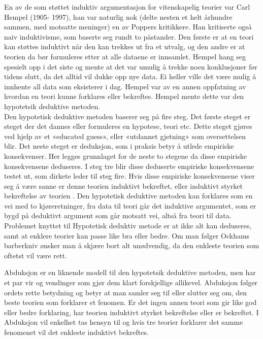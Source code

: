 \documentclass[
]{book}
\begin{document}
En av de som støttet induktiv argumentasjon for vitenskapelig teorier var Carl Hempel (1905- 1997), han var naturlig nok (delte nesten et helt århundre sammen, med motsatte meninger) en av Poppers kritikkere. Han kritiserte også naiv induktivisme, som baserte seg rundt to påstander. Den første er at en teori kan støttes induktivt når den kan trekkes ut fra et utvalg, og den andre er at teorien da bør formuleres etter at alle dataene er innsamlet. Hempel hang seg spesielt opp i det siste og mente at det var umulig å trekke noen konklusjoner før tidens slutt, da det alltid vil dukke opp nye data. Ei heller ville det være mulig å innhente all data som eksisterer i dag. \citep[s. 11]{hempel1966} Hempel var av en annen oppfatning av hvordan en teori kunne forklares eller bekreftes. Hempel mente dette var den hypotetsik deduktive metoden.\\

Den hypotetisk deduktive metoden baserer seg på fire steg. Det første steget er steget der det dannes eller formuleres en hypotese, teori etc. Dette steget gjøres ved hjelp av et «educated guess», eller «utdannet gjetning» som oversettelsen blir. Det neste steget er deduksjon, som i praksis betyr å utlede empiriske konsekvenser. Her legges grunnlaget for de neste to stegene da disse empiriske konsekvensene deduseres. I steg tre blir disse deduserte empiriske konsekvensene testet ut, som dirkete leder til steg fire. Hvis disse empiriske konsekvensene viser seg å være sanne er denne teorien induktivt bekreftet, eller induktivt styrket bekreftelse av teorien \citep[s.12-13]{hempel1966}. Den hypotetisk deduktive metoden kan forklares som en vei med to kjøreretninger, fra data til teori går det induktive argumentet, som er bygd på deduktivt argument som går motsatt vei, altså fra teori til data. Problemet knyttet til Hypotetisk deduktiv metode er at ikke alt kan deduseres, samt at enklere teorier kan passe like bra eller bedre. Om man følger Ockhams barberkniv ønsker man å skjære bort alt unødvendig, da den enkleste teorien som oftetst vil være rett.

Abduksjon er en liknende modell til den hypotetsik deduktive metoden, men har et par vir og vendinger som gjør dem klart forskjellige allikevel. Abduksjon følger ordets rette betydning og betyr at man samler seg til eller slutter seg om, den beste teorien som forklarer et fenomen. Er det ingen annen teori som gir like god eller bedre forklaring, har teorien induktivt styrket bekreftelse eller er bekreftet. I Abduksjon vil enkelhet tas hensyn til og hvis tre teorier forklarer det samme fenomenet vil det enkleste induktivt bekreftes.
\end{document}
